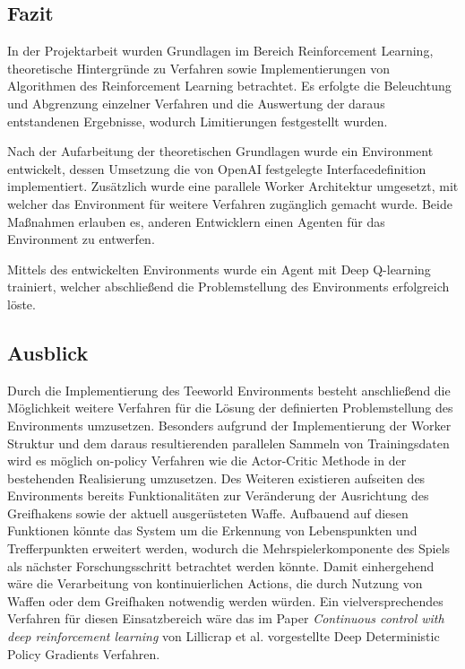 \documentclass[11pt]{scrartcl}
\begin{document}
\subsection{Fazit}
In der Projektarbeit wurden Grundlagen im Bereich Reinforcement Learning, theoretische Hintergründe
zu Verfahren sowie Implementierungen von Algorithmen des Reinforcement Learning betrachtet. Es
erfolgte die Beleuchtung und Abgrenzung einzelner Verfahren und die Auswertung der daraus
entstandenen Ergebnisse, wodurch Limitierungen festgestellt wurden.

Nach der Aufarbeitung der theoretischen Grundlagen wurde ein Environment entwickelt, dessen
Umsetzung die von OpenAI festgelegte Interfacedefinition implementiert. Zusätzlich wurde eine
parallele Worker Architektur umgesetzt, mit welcher das Environment für weitere Verfahren
zugänglich gemacht wurde. Beide Maßnahmen erlauben es, anderen Entwicklern einen Agenten für
das Environment zu entwerfen.

Mittels des entwickelten Environments wurde ein Agent mit Deep Q-learning trainiert, welcher
abschließend die Problemstellung des Environments erfolgreich löste.

\subsection{Ausblick}
Durch die Implementierung des Teeworld Environments besteht anschließend die Möglichkeit weitere Verfahren
für die Lösung der definierten Problemstellung des Environments umzusetzen. Besonders aufgrund der
Implementierung der Worker Struktur und dem daraus resultierenden parallelen Sammeln von Trainingsdaten
wird es möglich on-policy Verfahren wie die Actor-Critic Methode in der bestehenden Realisierung umzusetzen.
Des Weiteren existieren aufseiten des Environments bereits Funktionalitäten zur Veränderung der
Ausrichtung des Greifhakens sowie der aktuell ausgerüsteten Waffe. Aufbauend auf diesen Funktionen könnte
das System um die Erkennung von Lebenspunkten und Trefferpunkten erweitert werden, wodurch die
Mehrspielerkomponente des Spiels als nächster Forschungsschritt betrachtet werden könnte. Damit
einhergehend wäre die Verarbeitung von kontinuierlichen Actions, die durch Nutzung von Waffen oder dem
Greifhaken notwendig werden würden. Ein vielversprechendes Verfahren für diesen Einsatzbereich wäre
das im Paper \textit{Continuous control with deep reinforcement learning} von Lillicrap et al.
\cite{LHPHETSW2016} vorgestellte Deep Deterministic Policy Gradients Verfahren.
\end{document}
